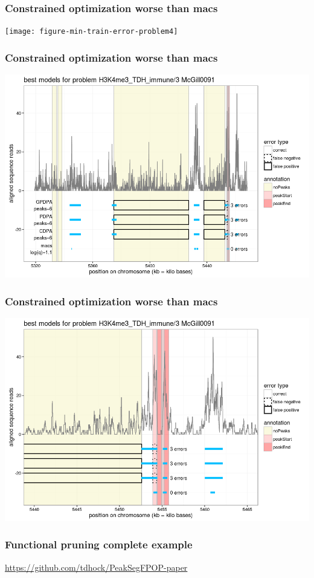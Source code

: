 \documentclass{beamer}
\begin{document}
\begin{frame}
  \frametitle{Constrained optimization worse than macs}
  \texttt{[image: figure-min-train-error-problem4]}
\end{frame}

\begin{frame}
  \frametitle{Constrained optimization worse than macs}
  \includegraphics[width=\textwidth]{figure-min-train-error-problem4-best}
\end{frame}

\begin{frame}
  \frametitle{Constrained optimization worse than macs}
  \includegraphics[width=\textwidth]{figure-min-train-error-problem4-best-zoom}
\end{frame}


\begin{frame}
  \frametitle{Functional pruning complete example}
    

  \url{https://github.com/tdhock/PeakSegFPOP-paper}
\end{frame}
\end{document}
